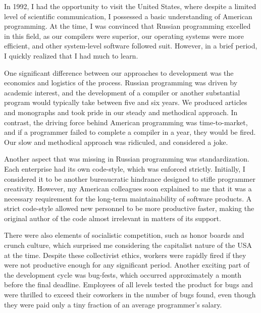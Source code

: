 \cleardoublepage
{}

In 1992, I had the opportunity to visit the United States, where despite a limited level of scientific communication, I possessed a basic understanding of American programming. At the time, I was convinced that Russian programming excelled in this field, as our compilers were superior, our operating systems were more efficient, and other system-level software followed suit. However, in a brief period, I quickly realized that I had much to learn.

One significant difference between our approaches to development was the economics and logistics of the process. Russian programming was driven by academic interest, and the development of a compiler or another substantial program would typically take between five and six years. We produced articles and monographs and took pride in our steady and methodical approach. In contrast, the driving force behind American programming was time-to-market, and if a programmer failed to complete a compiler in a year, they would be fired. Our slow and methodical approach was ridiculed, and considered a joke.

Another aspect that was missing in Russian programming was standardization. Each enterprise had its own code-style, which was enforced strictly. Initially, I considered it to be another bureaucratic hindrance designed to stifle programmer creativity. However, my American colleagues soon explained to me that it was a necessary requirement for the long-term maintainability of software products. A strict code-style allowed new personnel to be more productive faster, making the original author of the code almost irrelevant in matters of its support.

There were also elements of socialistic competition, such as honor boards and crunch culture, which surprised me considering the capitalist nature of the USA at the time. Despite these collectivist ethics, workers were rapidly fired if they were not productive enough for any significant period. Another exciting part of the development cycle was bug-fests, which occurred approximately a month before the final deadline. Employees of all levels tested the product for bugs and were thrilled to exceed their coworkers in the number of bugs found, even though they were paid only a tiny fraction of an average programmer's salary.

